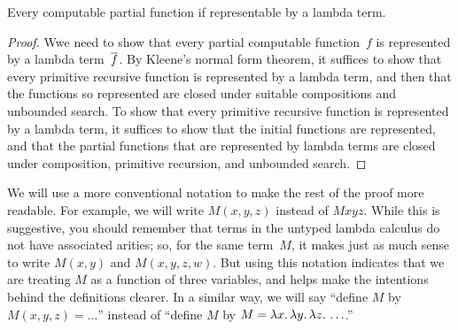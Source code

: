 \documentclass[../../include/open-logic-section]{subfiles}
\begin{document}

\begin{thm}
Every computable partial function if representable by a lambda term.
\end{thm}

\begin{proof}
Wwe need to show that every partial computable function~$f$ is
represented by a lambda term~$\overline{f}$. By Kleene's normal form
theorem, it suffices to show that every primitive recursive function
is represented by a lambda term, and then that the functions so
represented are closed under suitable compositions and unbounded
search. To show that every primitive recursive function is represented
by a lambda term, it suffices to show that the initial functions are
represented, and that the partial functions that are represented by
lambda terms are closed under composition, primitive recursion, and
unbounded search.
\end{proof}

We will use a more conventional notation to make the rest of the proof
more readable. For example, we will write $M(x, y, z)$ instead of
$Mxyz$. While this is suggestive, you should remember that terms in
the untyped lambda calculus do not have associated arities; so, for
the same term~$M$, it makes just as much sense to write $M(x,y)$ and
$M(x,y,z,w)$. But using this notation indicates that we are treating
$M$ as a function of three variables, and helps make the intentions
behind the definitions clearer. In a similar way, we will say ``define
$M$ by $M(x,y,z) = \dots$'' instead of ``define $M$ by $M =
\lambd[x][\lambd[y][\lambd[z][\dots]]]$.''
\end{document}
